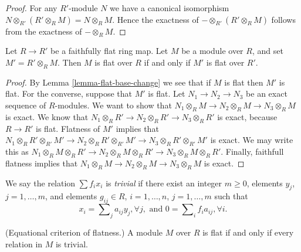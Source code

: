 \begin{proof}
For any $R'$-module $N$ we have a canonical
isomorphism $N \otimes_{R'} (R'\otimes_R M)
= N \otimes_R M$. Hence the exactness of
$-\otimes_{R'}(R'\otimes_R M)$ follows from
the exactness of $-\otimes_R M$.
\end{proof}

\begin{lemma}
\label{lemma-flatness-descends}
Let $R \to R'$ be a faithfully flat ring map.
Let $M$ be a module over $R$, and set $M' = R' \otimes_R M$.
Then $M$ is flat over $R$ if and only if $M'$ is flat over $R'$.
\end{lemma}

\begin{proof}
By Lemma \ref{lemma-flat-base-change} we see that if $M$ is flat
then $M'$ is flat. For the converse, suppose that $M'$ is flat.
Let $N_1 \to N_2 \to N_3$ be an exact sequence of $R$-modules.
We want to show that $N_1 \otimes_R M \to N_2 \otimes_R M \to N_3 \otimes_R M$
is exact. We know that
$N_1 \otimes_R R' \to N_2 \otimes_R R' \to N_3 \otimes_R R'$ is
exact, because $R \to R'$ is flat. Flatness of $M'$ implies that
$N_1 \otimes_R R' \otimes_{R'} M'
\to N_2 \otimes_R R' \otimes_{R'} M'
\to N_3 \otimes_R R' \otimes_{R'} M'$ is exact.
We may write this as
$N_1 \otimes_R M \otimes_R R'
\to N_2 \otimes_R M \otimes_R R'
\to N_3 \otimes_R M \otimes_R R'$.
Finally, faithfull flatness implies that
$N_1 \otimes_R M \to N_2 \otimes_R M \to N_3 \otimes_R M$
is exact.
\end{proof}

\noindent
We say the relation $\sum f_i x_i$
is {\it trivial} if there exist an integer $m \geq 0$,
elements $y_j$, $j = 1, \ldots, m$, and elements $g_{ij} \in R$,
$i = 1, \ldots, n$, $j = 1, \ldots, m$ such that
$$
x_i = \sum\nolimits_j a_{ij} y_j, \forall j,
\text{ and }
0 = \sum\nolimits_i f_ia_{ij}, \forall i.
$$

\begin{lemma}
\label{lemma-flat-eq}
(Equational criterion of flatness.)
A module $M$ over $R$ is flat if and only if
every relation in $M$ is trivial.
\end{lemma}

